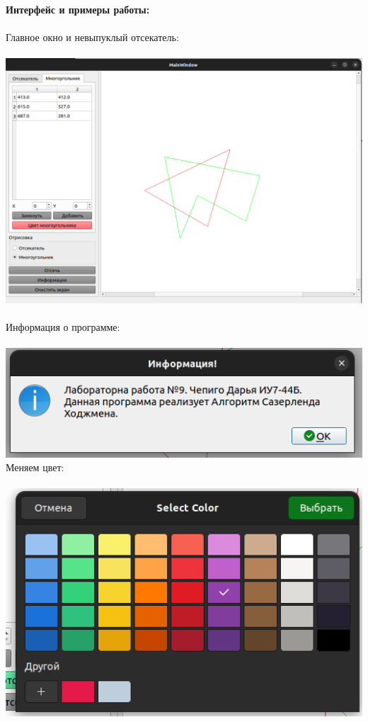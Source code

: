 \documentclass[a4paper,12pt]{article}
\begin{document}
	\newpage
	\noindent\textbf{Интерфейс и примеры работы:}\\\\
	Главное окно и невыпуклый отсекатель:\\\\
	\includegraphics[width=\linewidth]{mainwin}\\\\
	Информация о программе:\\\\
	\includegraphics[width=\linewidth]{infor}
	\newpage
	Меняем цвет:\\\\
	\includegraphics[width=\linewidth]{color}\\
\end{document}
